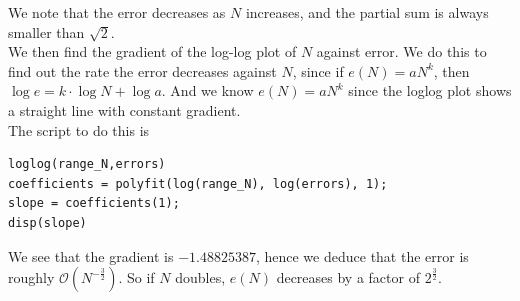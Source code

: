 \documentclass[10pt]{article}
\begin{document}
We note that the error decreases as $N$ increases, and the partial sum is always smaller than $\sqrt{2}$.\\
We then find the gradient of the log-log plot of $N$ against error. We do this to find out the rate the error decreases against $N$, since if $e(N)=aN^k$, then $\log e= k \cdot \log N + \log a$. And we know $e(N)=aN^k$ since the loglog plot shows a straight line with constant gradient.\\ The script to do this is
\begin{lstlisting}
loglog(range_N,errors)
coefficients = polyfit(log(range_N), log(errors), 1);
slope = coefficients(1);
disp(slope)
\end{lstlisting}
We see that the gradient is $-1.48825387$, hence we deduce that the error is roughly \underline{$\mathcal{O}(N^{-\frac{3}{2}})$}. So if $N$ doubles, $e(N)$ decreases by a factor of $2^{\frac{3}{2}}$.

\newpage
\end{document}
